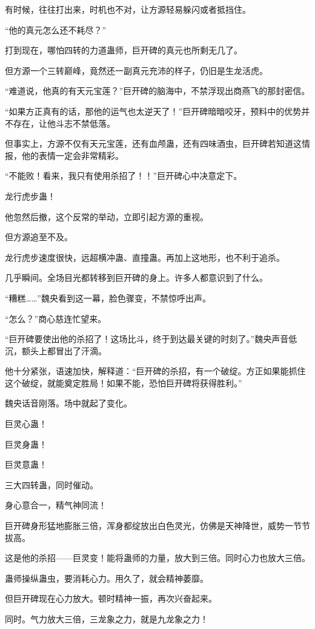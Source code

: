 \begin{this_body}
有时候，往往打出来，时机也不对，让方源轻易躲闪或者抵挡住。

“他的真元怎么还不耗尽？”

打到现在，哪怕四转的力道蛊师，巨开碑的真元也所剩无几了。

但方源一个三转巅峰，竟然还一副真元充沛的样子，仍旧是生龙活虎。

“难道说，他真的有天元宝莲？”巨开碑的脑海中，不禁浮现出商燕飞的那封密信。

“如果方正真有的话，那他的运气也太逆天了！”巨开碑暗暗咬牙，预料中的优势并不存在，让他斗志不禁低落。

但事实上，方源不仅有天元宝莲，还有血颅蛊，还有四味酒虫，巨开碑若知道这情报，他的表情一定会非常精彩。

“不能败！看来，我只有使用杀招了！！”巨开碑心中决意定下。

龙行虎步蛊！

他忽然后撤，这个反常的举动，立即引起方源的重视。

但方源追至不及。

龙行虎步速度很快，远超横冲蛊、直撞蛊。再加上这地形，也不利于追杀。

几乎瞬间。全场目光都转移到巨开碑的身上。许多人都意识到了什么。

“糟糕……”魏央看到这一幕，脸色骤变，不禁惊呼出声。

“怎么？”商心慈连忙望来。

“巨开碑要使出他的杀招了！这场比斗，终于到达最关键的时刻了。”魏央声音低沉，额头上都冒出了汗滴。

他十分紧张，语速加快，解释道：“巨开碑的杀招，有一个破绽。方正如果能抓住这个破绽，就能奠定胜局！如果不能，恐怕巨开碑将获得胜利。”

魏央话音刚落。场中就起了变化。

巨灵心蛊！

巨灵身蛊！

巨灵意蛊！

三大四转蛊，同时催动。

身心意合一，精气神同流！

巨开碑身形猛地膨胀三倍，浑身都绽放出白色灵光，仿佛是天神降世，威势一节节拔高。

这是他的杀招——巨灵变！能将蛊师的力量，放大到三倍。同时心力也放大三倍。

蛊师操纵蛊虫，要消耗心力。用久了，就会精神萎靡。

但巨开碑现在心力放大。顿时精神一振，再次兴奋起来。

同时。气力放大三倍，三龙象之力，就是九龙象之力！


\end{this_body}
